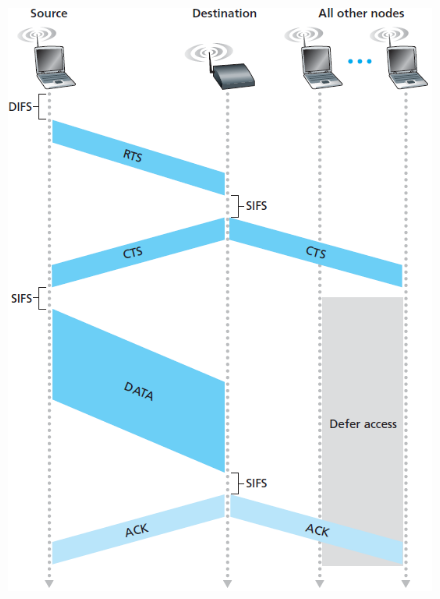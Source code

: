 \documentclass[10pt,letterpaper]{article}
\begin{document}
\begin{figure}[htbp]
\centering
\includegraphics[width=130mm]{CTSRTS.png}
\caption{}
\end{figure}
\end{document}
